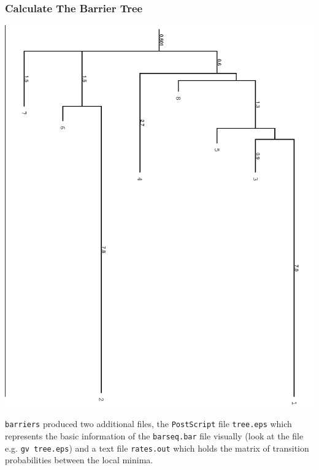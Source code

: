 \documentclass[a4paper]{article}
\newcommand{\frametitle}[1]{\subsubsection{#1}}
\begin{document}
\frametitle{Calculate The Barrier Tree}
\begin{center}
  \includegraphics[width=.5\textwidth]{Figures/tree.eps}
\end{center}
\texttt{barriers} produced two additional files, the \texttt{PostScript}
file \texttt{tree.eps} which represents the basic information of the
\texttt{barseq.bar} file visually (look at the file e.g. \texttt{gv tree.eps})
and a text file \texttt{rates.out} which holds the matrix of transition
probabilities between the local minima.
\end{document}
